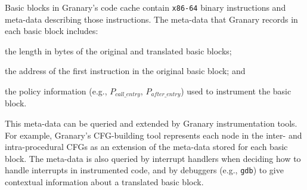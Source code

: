 \documentclass[preprint]{sigplanconf}
\begin{document}
Basic blocks in Granary's code cache contain \texttt{x86-64} binary instructions and meta-data describing those instructions. The meta-data that Granary records in each basic block includes: \begin{inparaenum}[i)]
	\item the length in bytes of the original and translated basic blocks;
	\item the address of the first instruction in the original basic block; and
	\item the policy information (e.g., $P_{\mathit{call\_entry}}$, $P_{\mathit{after\_entry}}$) used to instrument the basic block.
\end{inparaenum} This meta-data can be queried and extended by Granary instrumentation tools. For example, Granary's CFG-building tool represents each node in the inter- and intra-procedural CFGs as an extension of the meta-data stored for each basic block. The meta-data is also queried by interrupt handlers when deciding how to handle interrupts in instrumented code, and by debuggers (e.g., \texttt{gdb}) to give contextual information about a translated basic block. 






\end{document}
